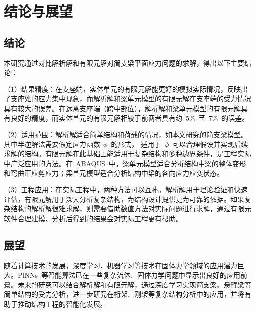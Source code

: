 \chapter{结论与展望}
\label{cha:conclusion}
\section{结论}
本研究通过对比解析解和有限元解对简支梁平面应力问题的求解，得出以下主要结论：

（1）结果精度：在支座端，实体单元的有限元解能更好的模拟实际情况，反映出了支座处的应力集中现象，而解析解和梁单元模型的有限元解在支座端的受力情况具有较大的误差。在远离支座端（跨中部位），解析解和梁单元模型的有限元解具有良好的精度，而实体单元的有限元解相较于前两者具有约~5\%~至~7\%~的误差。

（2）适用范围：解析解适合简单结构和荷载的情况，如本文研究的简支梁模型。其中半逆解法需要假定应力函数~$\phi$~的形式， 适用于~$\phi$~可以合理假设并实现后续求解的结构。有限元解在此基础上能适用于复杂结构和多种边界条件，是工程实际中广泛应用的方法。在~ABAQUS~中，梁单元模型适合分析结构中梁的整体变形和弯曲正应剪应力；梁单元模型适合分析结构中梁的各向应力应变状态。

（3）工程应用：在实际工程中，两种方法可以互补。解析解用于理论验证和快速评估，有限元解用于深入分析复杂结构，为结构设计提供更为可靠的依据。如果复杂结构的解析解很难求解，则需要借助数值方法对实际问题进行求解，通过有限元软件合理建模、分析后得到的结果会对实际工程更有帮助。

\section{展望}
随着计算技术的发展，深度学习、机器学习等技术在固体力学领域的应用潜力巨大。PINNs~等智能算法已在一些复杂流体、固体力学问题中显示出良好的应用前景。未来的研究可以结合解析解和有限元解，通过深度学习实现简支梁、悬臂梁等简单结构的受力分析，进一步研究在桁架、刚架等复杂结构分析中的应用，并将有助于推动结构工程的智能化发展。